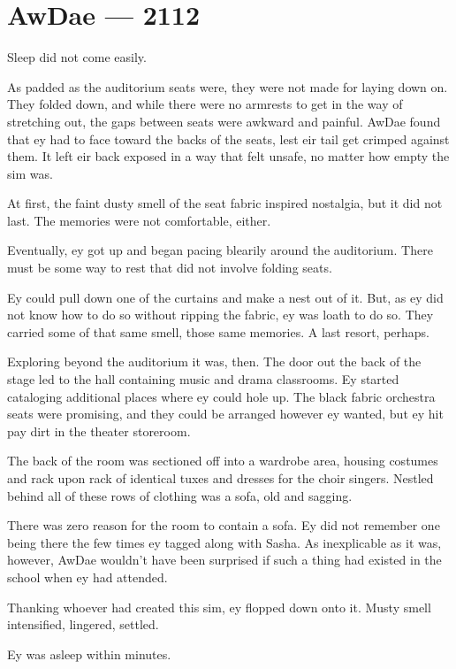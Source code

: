 \hypertarget{rj-brewster-2112}{%
\chapter*{AwDae — 2112}\label{rj-brewster-2112}}

Sleep did not come easily.

As padded as the auditorium seats were, they were not made for laying down on. They folded down, and while there were no armrests to get in the way of stretching out, the gaps between seats were awkward and painful. AwDae found that ey had to face toward the backs of the seats, lest eir tail get crimped against them. It left eir back exposed in a way that felt unsafe, no matter how empty the sim was.

At first, the faint dusty smell of the seat fabric inspired nostalgia, but it did not last. The memories were not comfortable, either.

Eventually, ey got up and began pacing blearily around the auditorium. There must be some way to rest that did not involve folding seats.

Ey could pull down one of the curtains and make a nest out of it. But, as ey did not know how to do so without ripping the fabric, ey was loath to do so. They carried some of that same smell, those same memories. A last resort, perhaps.

Exploring beyond the auditorium it was, then. The door out the back of the stage led to the hall containing music and drama classrooms. Ey started cataloging additional places where ey could hole up. The black fabric orchestra seats were promising, and they could be arranged however ey wanted, but ey hit pay dirt in the theater storeroom.

The back of the room was sectioned off into a wardrobe area, housing costumes and rack upon rack of identical tuxes and dresses for the choir singers. Nestled behind all of these rows of clothing was a sofa, old and sagging.

There was zero reason for the room to contain a sofa. Ey did not remember one being there the few times ey tagged along with Sasha. As inexplicable as it was, however, AwDae wouldn't have been surprised if such a thing had existed in the school when ey had attended.

Thanking whoever had created this sim, ey flopped down onto it. Musty smell intensified, lingered, settled.

Ey was asleep within minutes.

